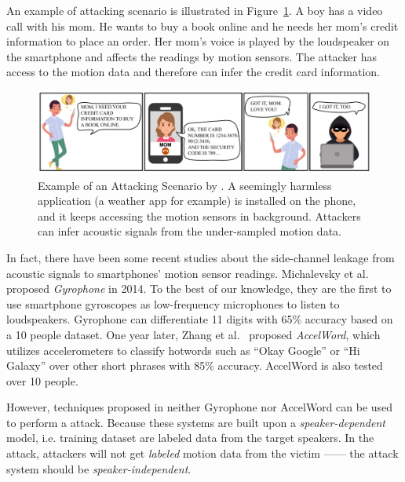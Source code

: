 An example of attacking scenario is  illustrated in  Figure~\ref{fig:teaserpic}. A boy has a video call with his mom. He wants to buy a book online and he needs her mom’s credit information to place an order. Her mom’s voice is played by the loudspeaker on the smartphone and affects the readings by motion sensors. The attacker has access to the motion data and therefore can infer the credit card information.  
%

\begin{figure}
	\centering
	\includegraphics[width=\linewidth]{Figures/SpyPhone/teaserpic}
	\caption[Example of an Attacking Scenario.]{Example of an Attacking Scenario by {\spp}. A seemingly harmless application (a weather app for example) is installed on the phone, and it keeps accessing the motion sensors in background. Attackers can infer acoustic signals from the under-sampled motion data. }
	\label{fig:teaserpic}
\end{figure}



In fact, there have been some recent studies about the side-channel leakage from acoustic signals to smartphones' motion sensor readings. Michalevsky et al.~\cite{michalevsky2014gyrophone} proposed \textit{Gyrophone} in 2014. To the best of our knowledge, they are the first to use smartphone gyroscopes as low-frequency microphones to listen to loudspeakers. Gyrophone can differentiate 11 digits with 65\% accuracy based on a 10 people dataset.
One year later, Zhang et al.~\cite{zhang2015accelword} proposed \textit{AccelWord}, which utilizes accelerometers to classify hotwords such as ``Okay Google'' or ``Hi Galaxy'' over other short phrases with 85\% accuracy. AccelWord is also tested over 10 people.

However, techniques proposed in neither Gyrophone nor AccelWord can be used to perform a {\attackName} attack. Because these systems are built upon a \textit{speaker-dependent} model, i.e. training dataset are labeled data from the target speakers. In the {\attackName} attack, attackers will not get \textit{labeled} motion data from the victim  ------ the attack system should be \textit{speaker-independent}.

